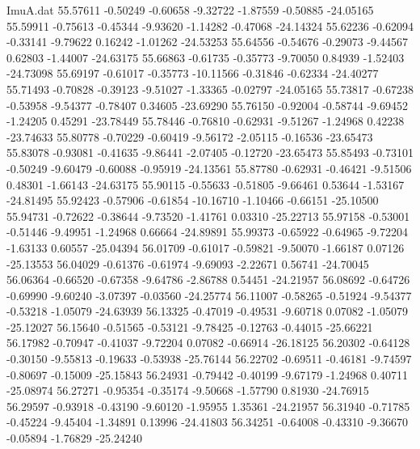 \begin{filecontents}{ImuA.dat}
  55.57611   -0.50249   -0.60658   -9.32722   -1.87559   -0.50885  -24.05165
  55.59911   -0.75613   -0.45344   -9.93620   -1.14282   -0.47068  -24.14324
  55.62236   -0.62094   -0.33141   -9.79622    0.16242   -1.01262  -24.53253
  55.64556   -0.54676   -0.29073   -9.44567    0.62803   -1.44007  -24.63175
  55.66863   -0.61735   -0.35773   -9.70050    0.84939   -1.52403  -24.73098
  55.69197   -0.61017   -0.35773  -10.11566   -0.31846   -0.62334  -24.40277
  55.71493   -0.70828   -0.39123   -9.51027   -1.33365   -0.02797  -24.05165
  55.73817   -0.67238   -0.53958   -9.54377   -0.78407    0.34605  -23.69290
  55.76150   -0.92004   -0.58744   -9.69452   -1.24205    0.45291  -23.78449
  55.78446   -0.76810   -0.62931   -9.51267   -1.24968    0.42238  -23.74633
  55.80778   -0.70229   -0.60419   -9.56172   -2.05115   -0.16536  -23.65473
  55.83078   -0.93081   -0.41635   -9.86441   -2.07405   -0.12720  -23.65473
  55.85493   -0.73101   -0.50249   -9.60479   -0.60088   -0.95919  -24.13561
  55.87780   -0.62931   -0.46421   -9.51506    0.48301   -1.66143  -24.63175
  55.90115   -0.55633   -0.51805   -9.66461    0.53644   -1.53167  -24.81495
  55.92423   -0.57906   -0.61854  -10.16710   -1.10466   -0.66151  -25.10500
  55.94731   -0.72622   -0.38644   -9.73520   -1.41761    0.03310  -25.22713
  55.97158   -0.53001   -0.51446   -9.49951   -1.24968    0.66664  -24.89891
  55.99373   -0.65922   -0.64965   -9.72204   -1.63133    0.60557  -25.04394
  56.01709   -0.61017   -0.59821   -9.50070   -1.66187    0.07126  -25.13553
  56.04029   -0.61376   -0.61974   -9.69093   -2.22671    0.56741  -24.70045
  56.06364   -0.66520   -0.67358   -9.64786   -2.86788    0.54451  -24.21957
  56.08692   -0.64726   -0.69990   -9.60240   -3.07397   -0.03560  -24.25774
  56.11007   -0.58265   -0.51924   -9.54377   -0.53218   -1.05079  -24.63939
  56.13325   -0.47019   -0.49531   -9.60718    0.07082   -1.05079  -25.12027
  56.15640   -0.51565   -0.53121   -9.78425   -0.12763   -0.44015  -25.66221
  56.17982   -0.70947   -0.41037   -9.72204    0.07082   -0.66914  -26.18125
  56.20302   -0.64128   -0.30150   -9.55813   -0.19633   -0.53938  -25.76144
  56.22702   -0.69511   -0.46181   -9.74597   -0.80697   -0.15009  -25.15843
  56.24931   -0.79442   -0.40199   -9.67179   -1.24968    0.40711  -25.08974
  56.27271   -0.95354   -0.35174   -9.50668   -1.57790    0.81930  -24.76915
  56.29597   -0.93918   -0.43190   -9.60120   -1.95955    1.35361  -24.21957
  56.31940   -0.71785   -0.45224   -9.45404   -1.34891    0.13996  -24.41803
  56.34251   -0.64008   -0.43310   -9.36670   -0.05894   -1.76829  -25.24240

\end{filecontents}
